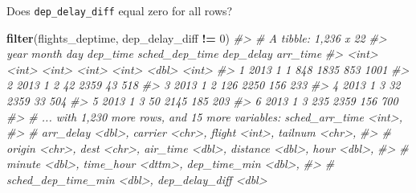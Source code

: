\documentclass[]{book}
\newenvironment{Shaded}{\begin{snugshade}}{\end{snugshade}}
\newcommand{\CommentTok}[1]{\textcolor[rgb]{0.56,0.35,0.01}{\textit{#1}}}
\newcommand{\DataTypeTok}[1]{\textcolor[rgb]{0.13,0.29,0.53}{#1}}
\newcommand{\DecValTok}[1]{\textcolor[rgb]{0.00,0.00,0.81}{#1}}
\newcommand{\KeywordTok}[1]{\textcolor[rgb]{0.13,0.29,0.53}{\textbf{#1}}}
\newcommand{\NormalTok}[1]{#1}
\newcommand{\OperatorTok}[1]{\textcolor[rgb]{0.81,0.36,0.00}{\textbf{#1}}}
\newcommand{\StringTok}[1]{\textcolor[rgb]{0.31,0.60,0.02}{#1}}
\theoremstyle{plain}
\theoremstyle{remark}
\begin{document}
\begin{Shaded}
\end{Shaded}

Does \texttt{dep\_delay\_diff} equal zero for all rows?

\begin{Shaded}
\begin{Highlighting}[]
\KeywordTok{filter}\NormalTok{(flights_deptime, dep_delay_diff }\OperatorTok{!=}\StringTok{ }\DecValTok{0}\NormalTok{)}
\CommentTok{#> # A tibble: 1,236 x 22}
\CommentTok{#>    year month   day dep_time sched_dep_time dep_delay arr_time}
\CommentTok{#>   <int> <int> <int>    <int>          <int>     <dbl>    <int>}
\CommentTok{#> 1  2013     1     1      848           1835       853     1001}
\CommentTok{#> 2  2013     1     2       42           2359        43      518}
\CommentTok{#> 3  2013     1     2      126           2250       156      233}
\CommentTok{#> 4  2013     1     3       32           2359        33      504}
\CommentTok{#> 5  2013     1     3       50           2145       185      203}
\CommentTok{#> 6  2013     1     3      235           2359       156      700}
\CommentTok{#> # ... with 1,230 more rows, and 15 more variables: sched_arr_time <int>,}
\CommentTok{#> #   arr_delay <dbl>, carrier <chr>, flight <int>, tailnum <chr>,}
\CommentTok{#> #   origin <chr>, dest <chr>, air_time <dbl>, distance <dbl>, hour <dbl>,}
\CommentTok{#> #   minute <dbl>, time_hour <dttm>, dep_time_min <dbl>,}
\CommentTok{#> #   sched_dep_time_min <dbl>, dep_delay_diff <dbl>}
\end{Highlighting}
\end{Shaded}
\end{document}
